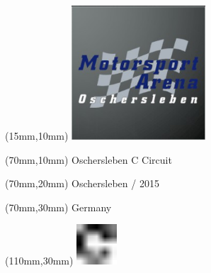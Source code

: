 \null\newpage
\begin{textblock*}{50mm}(15mm,10mm)%
\includegraphics[width=50mm]{LG/2015-05-20_00090.png}
\end{textblock*}
\begin{textblock*}{130mm}(70mm,10mm)%
{\fontsize{20}{20}\selectfont Oschersleben C Circuit}\\
\end{textblock*}
\begin{textblock*}{120mm}(70mm,20mm)%
{\fontsize{16}{16}\selectfont Oschersleben / 2015}\\
\end{textblock*}
\begin{textblock*}{120mm}(70mm,30mm)%
{\fontsize{12}{12}\selectfont Germany}
\end{textblock*}
\begin{textblock*}{30mm}(110mm,30mm)%
\centering
\includegraphics[height=15mm]{icons/fa-rotate-right.pdf}
\end{textblock*}
